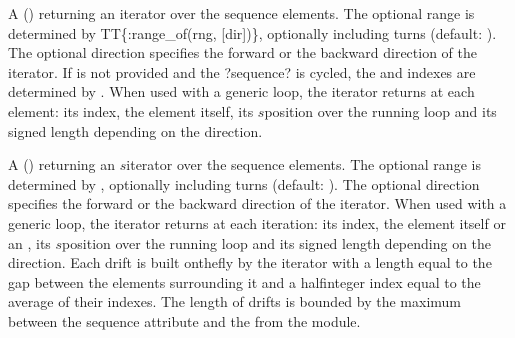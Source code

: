 \documentclass[letterpaper,10pt,english]{sphinxmanual}
\begin{document}
\begin{description}
\sphinxAtStartPar
A  (\sphinxcode{\sphinxupquote{{[}rng{]}, {[}ntrn{]}, {[}dir{]}}}) returning an iterator over the sequence elements. The optional range is determined by
TT\{:range\_of(rng, {[}dir{]})\}, optionally including  turns (default: ). The optional direction  specifies the forward 
or the backward  direction of the iterator. If  is not provided and the ?sequence? is cycled, the  and  indexes are
determined by . When used with a generic  loop, the iterator returns at each element: its index,
the element itself, its \(s\)\sphinxhyphen{}position over the running loop and its signed length depending on the direction.

\sphinxAtStartPar
A  (\sphinxcode{\sphinxupquote{{[}rng{]}, {[}ntrn{]}, {[}dir{]}}}) returning an \(s\)\sphinxhyphen{}iterator over the sequence elements. The optional range is determined by
, optionally including  turns (default: ). The optional direction  specifies the
forward  or the backward  direction of the iterator. When used with a generic  loop, the iterator returns at each
iteration: its index, the element itself or an  , its \(s\)\sphinxhyphen{}position over the running loop and its signed length
depending on the direction. Each  drift is built on\sphinxhyphen{}the\sphinxhyphen{}fly by the iterator with a length equal to the gap between the elements
surrounding it and a half\sphinxhyphen{}integer index equal to the average of their indexes. The length of  drifts is bounded by the maximum
between the sequence attribute  and the  from the {\hyperref[\detokenize{constants::doc}]{}} module.


\end{description}
\end{document}
